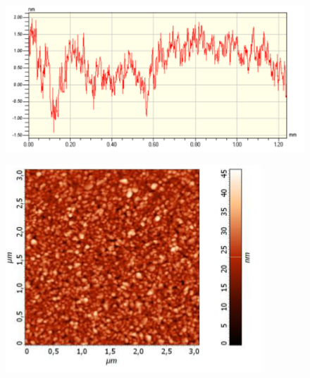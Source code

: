 \begin{figure}
		\includegraphics[width=\textwidth]{images/multilayer/plp-afm-chropo-1d.png}\\
\end{figure}

\begin{figure}
		\includegraphics[width=\textwidth]{images/multilayer/plp-afm-chropo.png}\\
\end{figure}


